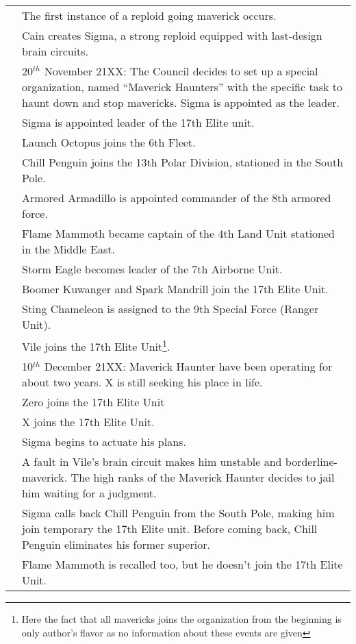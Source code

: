 \begin{tabularx}{\linewidth}{l X}
	\tabdot& The first instance of a reploid going maverick occurs.\\
	\tabdot& Cain creates Sigma, a strong reploid equipped with last-design brain circuits.\\
	\tabdot& 20$^{th}$ November 21XX: The Council decides to set up a special organization, named ``Maverick Haunters'' with the specific task to haunt down and stop mavericks. Sigma is appointed as the leader.\\
	\tabline& Sigma is appointed leader of the 17th Elite unit.\\
	\tabline& Launch Octopus joins the 6th Fleet.\\
	\tabline& Chill Penguin joins the 13th Polar Division, stationed in the South Pole.\\
	\tabline& Armored Armadillo is appointed commander of the 8th armored force.\\
	\tabline& Flame Mammoth became captain of the 4th Land Unit stationed in the Middle East.\\
	\tabline& Storm Eagle becomes leader of the 7th Airborne Unit.\\
	\tabline& Boomer Kuwanger and Spark Mandrill join the 17th Elite Unit.\\
	\tabline& Sting Chameleon is assigned to the 9th Special Force (Ranger Unit).\\
	\tabline& Vile joins the 17th Elite Unit\footnote{Here the fact that all mavericks joins the organization from the beginning is only author's flavor as no information about these events are given}.\\
	\tabdot& 10$^{th}$ December 21XX: Maverick Haunter have been operating for about two years. X is still seeking his place in life.\\
	\tabdot& Zero joins the 17th Elite Unit\\
	\tabdot& X joins the 17th Elite Unit.\\
	\tabdot& Sigma begins to actuate his plans.\\
	\tabdot& A fault in Vile's brain circuit makes him unstable and borderline-maverick. The high ranks of the Maverick Haunter decides to jail him waiting for a judgment.\\
	\tabdot& Sigma calls back Chill Penguin from the South Pole, making him join temporary the 17th Elite unit. Before coming back, Chill Penguin eliminates his former superior.\\
	\tabdot& Flame Mammoth is recalled too, but he doesn't join the 17th Elite Unit.\\

\end{tabularx}
